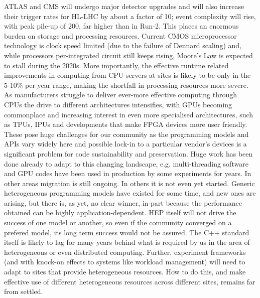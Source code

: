 \documentclass[11pt,a4paper]{article}
\begin{document}
ATLAS and CMS will undergo major detector upgrades and will also
increase their trigger rates for HL-LHC by about a factor of 10; event
complexity will rise, with peak pile-up of 200, far higher than in
Run-2. This places an enormous burden on storage and processing
resources. Current CMOS microprocessor technology is clock speed limited
(due to the failure of Dennard scaling) and, while processors
per-integrated circuit still keeps rising, Moore's Law is expected to
stall during the 2020s. More importantly, the effective runtime related
improvements in computing from CPU servers at sites is likely to be only
in the 5-10\% per year range, making the shortfall in processing
resources more severe. As manufacturers struggle to deliver ever-more
effective computing through CPUs the drive to different architectures
intensifies, with GPUs becoming commonplace and increasing interest in
even more specialised architectures, such as TPUs, IPUs and developments
that make FPGA devices more user friendly. These pose huge challenges
for our community as the programming models and APIs vary widely here
and possible lock-in to a particular vendor's devices is a significant
problem for code sustainability and preservation. Huge work has been
done already to adapt to this changing landscape, e.g. multi-threading
software and GPU codes have been used in production by some experiments
for years. In other areas migration is still ongoing. In others it is
not even yet started. Generic heterogeneous programming models have
existed for some time, and new ones are arising, but there is, as yet,
no clear winner, in-part because the performance obtained can be highly
application-dependent. HEP itself will not drive the success of one
model or another, so even if the community converged on a prefered
model, its long term success would not be assured. The C++ standard
itself is likely to lag for many years behind what is required by us in
the area of heterogeneous or even distributed computing. Further,
experiment frameworks (and with knock-on effects to systems like
workload management) will need to adapt to sites that provide
heterogeneous resources. How to do this, and make effective use of
different heterogeneous resources across different sites, remains far
from settled.
\end{document}

